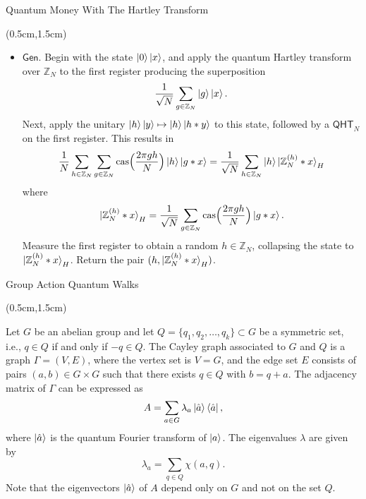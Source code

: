 \documentclass{beamer}
\theoremstyle{definition}
\newcommand{\cas}{\mathrm{cas}}
\newcommand{\qht}{\mathsf{QHT}}
\newcommand{\gen}{\mathsf{Gen}}
\begin{document}
\begin{frame}{Quantum Money With The Hartley Transform}
    
    \begin{textblock*}{12cm}(0.5cm,1.5cm)
            
        
       
        \begin{itemize}
            \item $\gen$. Begin with the state $\ket{0}\ket{x}$, and apply the quantum Hartley transform over $\mathbb{Z}_N$ to the first register producing the superposition
            \[ \frac{1}{\sqrt{N}} \sum_{g \in \mathbb{Z}_N} \ket{g}\ket{x}. \]
            Next, apply the unitary $\ket{h}\ket{y} \mapsto \ket{h}\ket{h * y}$ to this state, followed by a $\qht_N$ on the first register. This results in
            \[ \frac{1}{N} \sum_{h \in \mathbb{Z}_N} \sum_{g \in \mathbb{Z}_N} \cas\Big(\frac{2\pi gh}{N}\Big) \ket{h}\ket{g * x} = \frac{1}{\sqrt{N}} \sum_{h \in \mathbb{Z}_N} \ket{h} \ket{\mathbb{Z}_N^{(h)} * x}_H \]
            where
            \[ \ket{\mathbb{Z}_N^{(h)} * x}_H = \frac{1}{\sqrt{N}} \sum_{g \in \mathbb{Z}_N} \cas\Big(\frac{2\pi gh}{N}\Big) \ket{g * x}. \]
            Measure the first register to obtain a random $h \in \mathbb{Z}_N$, collapsing the state to $\ket{\mathbb{Z}_N^{(h)} * x}_H$. Return the pair $(h, \ket{\mathbb{Z}_N^{(h)} * x}_H)$.

        \end{itemize}
        
       
        
    \end{textblock*}


\end{frame}





\begin{frame}{Group Action Quantum Walks}
    
    \begin{textblock*}{12cm}(0.5cm,1.5cm)
            
        Let $G$ be an abelian group and let $Q = \{q_1, q_2, \dots, q_k\} \subset G$ be a symmetric set, i.e., $q \in Q$ if and only if $-q \in Q$. The Cayley graph associated to $G$ and $Q$ is a graph $\Gamma = (V, E)$, where the vertex set is $V = G$, and the edge set $E$ consists of pairs $(a, b) \in G \times G$ such that there exists $q \in Q$ with $b = q + a$. The adjacency matrix of $\Gamma$ can be expressed as
        \[ A = \sum_{a \in G} \lambda_a \ket{\hat{a}} \bra{\hat{a}}, \]
        where $\ket{\hat{a}}$ is the quantum Fourier transform of $\ket{a}$. The eigenvalues $\lambda$ are given by
        \[ \lambda_a = \sum_{q \in Q} \chi(a, q). \]
        Note that the eigenvectors $\ket{\hat{a}}$ of $A$ depend only on $G$ and not on the set $Q$.
    \end{textblock*}


\end{frame}
\end{document}
